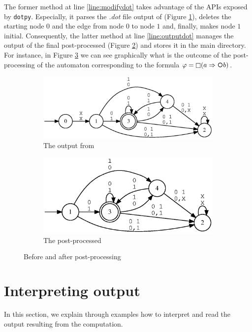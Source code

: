 The former method at line \ref{line:modifydot} takes advantage of the APIs exposed by \texttt{dotpy}. Especially, it parses the \textit{.dot} file output of \MONA (Figure \ref{fig:mona-output}), deletes the starting node $0$ and the edge from node $0$ to node $1$ and, finally, makes node $1$ initial. Consequently, the latter method at line \ref{line:outputdot} manages the output of the final post-processed \DFA (Figure \ref{fig:automa-post-processed}) and stores it in the main directory.
For instance, in Figure \ref{fig:pre-post-automaton} we can see graphically what is the outcome of the post-processing of the automaton corresponding to the formula $\varphi = \Always (a \Rightarrow \Next b)$.
\begin{figure}[h]
\centering
\begin{subfigure}{.5\textwidth}
  \centering
  \includegraphics[width=\linewidth]{images/pre-automaton.eps}
  \caption{The \DFA output from \MONA}
  \label{fig:mona-output}
\end{subfigure}%
\begin{subfigure}{.5\textwidth}
  \centering
  \includegraphics[width=\linewidth]{images/post-automaton.eps}
  \caption{The \DFA post-processed}
  \label{fig:automa-post-processed}
\end{subfigure}
\caption{Before and after \DFA post-processing}
\label{fig:pre-post-automaton}
\end{figure}
\section{Interpreting \LTLfToDFA output}
In this section, we explain through examples how to interpret and read the output \DFA resulting from the \LTLfToDFA computation.

